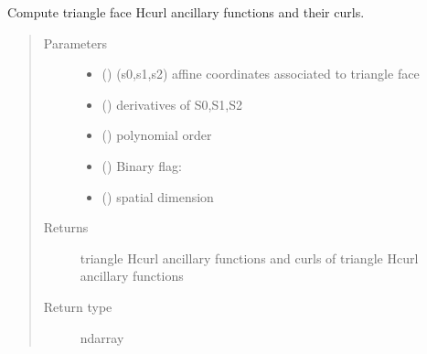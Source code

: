 \documentclass[letterpaper,10pt,english]{sphinxmanual}
\begin{document}

\begin{fulllineitems}
\label{\detokenize{petgem/hvfem:petgem.hvfem.AncETri}}
Compute triangle face Hcurl ancillary functions and their curls.
\begin{quote}\begin{description}
\item[{Parameters}] \leavevmode\begin{itemize}
\item {} 
 () \textendash{} (s0,s1,s2) affine coordinates associated to triangle face

\item {} 
 () \textendash{} derivatives of S0,S1,S2

\item {} 
 () \textendash{} polynomial order

\item {} 
 () \textendash{} Binary flag:

\item {} 
 () \textendash{} spatial dimension

\end{itemize}

\item[{Returns}] \leavevmode
triangle Hcurl ancillary functions and curls of triangle Hcurl ancillary functions

\item[{Return type}] \leavevmode
ndarray

\end{description}\end{quote}

\end{fulllineitems}

\end{document}
